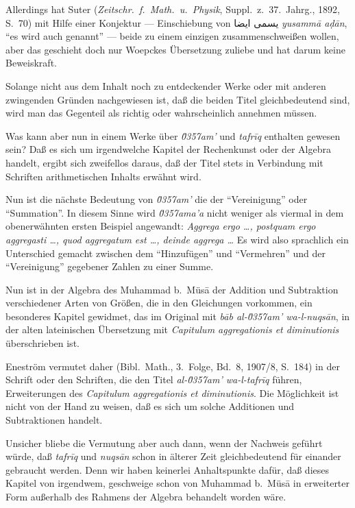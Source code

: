 \documentclass[11pt,a4paper]{article}
\newcommand{\RL}[1]{\beginR#1\endR}
\newcommand{\ar}[1]{{\arabicfont\RL{#1}}}
\newcommand{\enquote}[1]{``#1''}
\begin{document}
Allerdings hat Suter (\textit{Zeitschr.\ f.\ Math.\ u.\ Physik}, Suppl.\ z.\ 37.\ Jahrg., 1892, S.\ 70) mit Hilfe einer Konjektur --- Einschiebung von \ar{يسمى ايضا} \textit{yusamm\=a a\d{d}\=an}, \enquote{es wird auch genannt} --- beide zu einem einzigen zusammenschwei\ss{}en wollen, aber das geschieht doch nur Woepckes \"Ubersetzung zuliebe und hat darum keine Beweiskraft.

Solange nicht aus dem Inhalt noch zu entdeckender Werke oder mit anderen zwingenden Gr\"unden nachgewiesen ist, da\ss{} die beiden Titel gleichbedeutend sind, wird man das Gegenteil als richtig oder wahrscheinlich annehmen m\"ussen.

Was kann aber nun in einem Werke \"uber \textit{\u0357{}am'} und \textit{tafr\={i}q} enthalten gewesen sein? Da\ss{} es sich um irgendwelche Kapitel der Rechenkunst oder der Algebra handelt, ergibt sich zweifellos daraus, da\ss{} der Titel stets in Verbindung mit Schriften arithmetischen Inhalts erw\"ahnt wird.

Nun ist die n\"achste Bedeutung von \textit{\u0357{}am'} die der \enquote{Vereinigung} oder \enquote{Summation}. In diesem Sinne wird \textit{\u0357{}ama'a} nicht weniger als viermal in dem obenerw\"ahnten ersten Beispiel angewandt: \textit{Aggrega ergo \ldots{}, postquam ergo aggregasti \ldots{}, quod aggregatum est \ldots{}, deinde aggrega \ldots{}} Es wird also sprachlich ein Unterschied gemacht zwischen dem \enquote{Hinzuf\"ugen} und \enquote{Vermehren} und der \enquote{Vereinigung} gegebener Zahlen zu einer Summe.

Nun ist in der Algebra des Muhammad b.\ M\"us\=a der Addition und Subtraktion verschiedener Arten von Gr\"o\ss{}en, die in den Gleichungen vorkommen, ein besonderes Kapitel gewidmet, das im Original mit \textit{b\=ab al-\u0357{}am' wa-l-nuqs\=an}, in der alten lateinischen \"Ubersetzung mit \textit{Capitulum aggregationis et diminutionis} \"uberschrieben ist.

Enestr\"om vermutet daher (Bibl.\ Math., 3.\ Folge, Bd.\ 8, 1907/8, S.\ 184) in der Schrift oder den Schriften, die den Titel \textit{al-\u0357{}am' wa-l-tafr\={i}q} f\"uhren, Erweiterungen des \textit{Capitulum aggregationis et diminutionis}. Die M\"oglichkeit ist nicht von der Hand zu weisen, da\ss{} es sich um solche Additionen und Subtraktionen handelt.

Unsicher bliebe die Vermutung aber auch dann, wenn der Nachweis gef\"uhrt w\"urde, da\ss{} \textit{tafr\={i}q} und \textit{nuqs\=an} schon in \"alterer Zeit gleichbedeutend f\"ur einander gebraucht werden. Denn wir haben keinerlei Anhaltspunkte daf\"ur, da\ss{} dieses Kapitel von irgendwem, geschweige schon von Muhammad b.\ M\"us\=a in erweiterter Form au\ss{}erhalb des Rahmens der Algebra behandelt worden w\"are.
\end{document}
